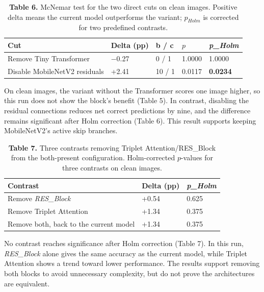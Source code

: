 \begin{table}[H]
\centering
\caption*{\textbf{Table 6.} McNemar test for the two direct cuts on clean images. Positive delta means the current model outperforms the variant; $p_{Holm}$ is corrected for two predefined contrasts.}
\label{tab:6}
\footnotesize
\setlength{\tabcolsep}{3pt}
\renewcommand{\arraystretch}{1.15}
\begin{tabular}{lllll}
\toprule
\textbf{Cut} & \textbf{Delta (pp)} & \textbf{b / c} & $p$ & \emph{\textbf{p\_Holm}} \\
\midrule
Remove Tiny Transformer & $-$0.27 & 0 / 1 & 1.0000 & 1.0000 \\
Disable MobileNetV2 residuals & +2.41 & 10 / 1 & 0.0117 & \textbf{0.0234} \\
\bottomrule
\end{tabular}
\end{table}

On clean images, the variant without the Transformer scores one image higher, so this run does not show the block's benefit (Table 5). In contrast, disabling the residual connections reduces net correct predictions by nine, and the difference remains significant after Holm correction (Table 6). This result supports keeping MobileNetV2's active skip branches.

\begin{table}[H]
\centering
\caption*{\textbf{Table 7.} Three contrasts removing Triplet Attention/RES\_Block from the both-present configuration. Holm-corrected $p$-values for three contrasts on clean images.}
\label{tab:7}
\small
\renewcommand{\arraystretch}{1.15}
\begin{tabular}{lll}
\toprule
\textbf{Contrast} & \textbf{Delta (pp)} & \emph{\textbf{p\_Holm}} \\
\midrule
Remove \emph{RES\_Block} & +0.54 & 0.625 \\
Remove Triplet Attention & +1.34 & 0.375 \\
Remove both, back to the current model & +1.34 & 0.375 \\
\bottomrule
\end{tabular}
\end{table}

No contrast reaches significance after Holm correction (Table 7). In this run, \emph{RES\_Block} alone gives the same accuracy as the current model, while Triplet Attention shows a trend toward lower performance. The results support removing both blocks to avoid unnecessary complexity, but do not prove the architectures are equivalent.

